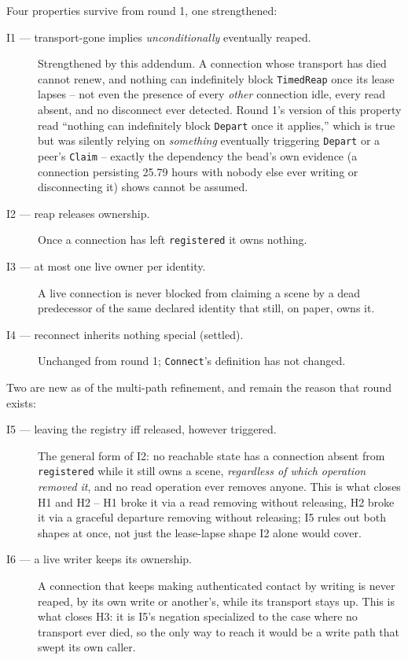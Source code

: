 \documentclass[a4paper,10pt,fleqn]{article}
\begin{document}
Four properties survive from round 1, one strengthened:

\begin{description}
  \item[I1 --- transport-gone implies \emph{unconditionally} eventually
    reaped.] Strengthened by this addendum. A connection whose transport
    has died cannot renew, and nothing can indefinitely block
    \texttt{TimedReap} once its lease lapses -- not even the presence of
    every \emph{other} connection idle, every read absent, and no
    disconnect ever detected. Round 1's version of this property read
    ``nothing can indefinitely block \texttt{Depart} once it applies,''
    which is true but was silently relying on \emph{something} eventually
    triggering \texttt{Depart} or a peer's \texttt{Claim} -- exactly the
    dependency the bead's own evidence (a connection persisting 25.79
    hours with nobody else ever writing or disconnecting it) shows cannot
    be assumed.
  \item[I2 --- reap releases ownership.] Once a connection has left
    \texttt{registered} it owns nothing.
  \item[I3 --- at most one live owner per identity.] A live connection is
    never blocked from claiming a scene by a dead predecessor of the same
    declared identity that still, on paper, owns it.
  \item[I4 --- reconnect inherits nothing special (settled).] Unchanged
    from round 1; \texttt{Connect}'s definition has not changed.
\end{description}

Two are new as of the multi-path refinement, and remain the reason that
round exists:

\begin{description}
  \item[I5 --- leaving the registry iff released, however triggered.] The
    general form of I2: no reachable state has a connection absent from
    \texttt{registered} while it still owns a scene, \emph{regardless of
    which operation removed it}, and no read operation ever removes
    anyone. This is what closes H1 and H2 -- H1 broke it via a read
    removing without releasing, H2 broke it via a graceful departure
    removing without releasing; I5 rules out both shapes at once, not
    just the lease-lapse shape I2 alone would cover.
  \item[I6 --- a live writer keeps its ownership.] A connection that keeps
    making authenticated contact by writing is never reaped, by its own
    write or another's, while its transport stays up. This is what closes
    H3: it is I5's negation specialized to the case where no transport
    ever died, so the only way to reach it would be a write path that
    swept its own caller.
\end{description}
\end{document}
